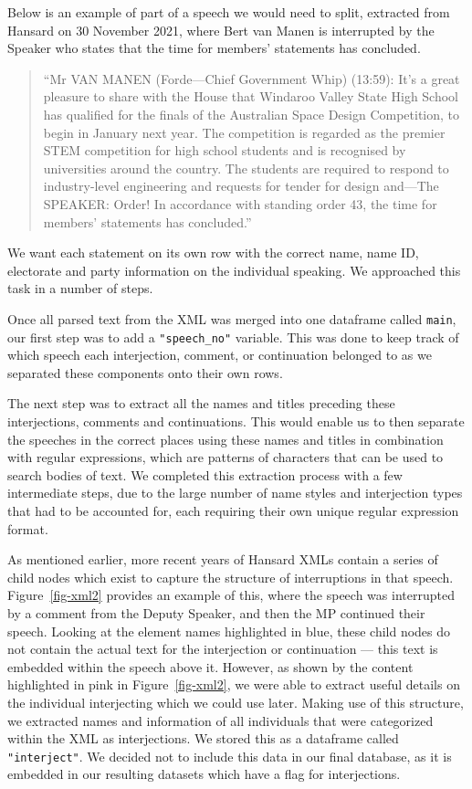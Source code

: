 \documentclass[
  letterpaper,
  DIV=11,
  numbers=noendperiod]{scrartcl}
\begin{document}
Below is an example of part of a speech we would need to split,
extracted from Hansard on 30 November 2021, where Bert van Manen is
interrupted by the Speaker who states that the time for members'
statements has concluded.

\begin{quote}
``Mr VAN MANEN (Forde---Chief Government Whip) (13:59): It's a great
pleasure to share with the House that Windaroo Valley State High School
has qualified for the finals of the Australian Space Design Competition,
to begin in January next year. The competition is regarded as the
premier STEM competition for high school students and is recognised by
universities around the country. The students are required to respond to
industry-level engineering and requests for tender for design and---The
SPEAKER: Order! In accordance with standing order 43, the time for
members' statements has concluded.''
\end{quote}

We want each statement on its own row with the correct name, name ID,
electorate and party information on the individual speaking. We
approached this task in a number of steps.

Once all parsed text from the XML was merged into one dataframe called
\texttt{main}, our first step was to add a \texttt{"speech\_no"}
variable. This was done to keep track of which speech each interjection,
comment, or continuation belonged to as we separated these components
onto their own rows.

The next step was to extract all the names and titles preceding these
interjections, comments and continuations. This would enable us to then
separate the speeches in the correct places using these names and titles
in combination with regular expressions, which are patterns of
characters that can be used to search bodies of text. We completed this
extraction process with a few intermediate steps, due to the large
number of name styles and interjection types that had to be accounted
for, each requiring their own unique regular expression format.

As mentioned earlier, more recent years of Hansard XMLs contain a series
of child nodes which exist to capture the structure of interruptions in
that speech. Figure~\ref{fig-xml2} provides an example of this, where
the speech was interrupted by a comment from the Deputy Speaker, and
then the MP continued their speech. Looking at the element names
highlighted in blue, these child nodes do not contain the actual text
for the interjection or continuation --- this text is embedded within
the speech above it. However, as shown by the content highlighted in
pink in Figure~\ref{fig-xml2}, we were able to extract useful details on
the individual interjecting which we could use later. Making use of this
structure, we extracted names and information of all individuals that
were categorized within the XML as interjections. We stored this as a
dataframe called \texttt{"interject"}. We decided not to include this
data in our final database, as it is embedded in our resulting datasets
which have a flag for interjections.
\end{document}
